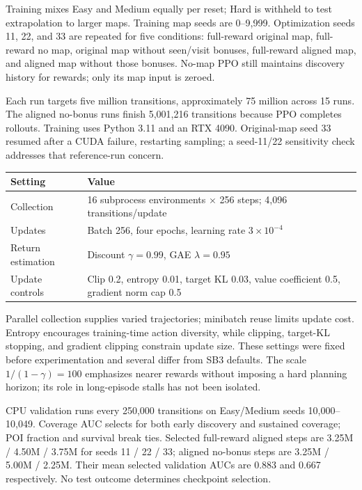 \documentclass[10pt,a4paper]{article}
\newcommand{\heading}[1]{\vspace{5pt}{\large\bfseries\color{ink}#1}\par\vspace{1pt}}
\begin{document}
\newpage
\heading{5\quad Training setup and baselines}
Training mixes Easy and Medium equally per reset; Hard is withheld to test extrapolation to larger maps. Training map seeds are 0--9,999. Optimization seeds 11, 22, and 33 are repeated for five conditions: full-reward original map, full-reward no map, original map without seen/visit bonuses, full-reward aligned map, and aligned map without those bonuses. No-map PPO still maintains discovery history for rewards; only its map input is zeroed.

Each run targets five million transitions, approximately 75 million across 15 runs. The aligned no-bonus runs finish 5,001,216 transitions because PPO completes rollouts. Training uses Python 3.11 and an RTX 4090. Original-map seed 33 resumed after a CUDA failure, restarting sampling; a seed-11/22 sensitivity check addresses that reference-run concern.
\begin{center}\small
\begin{tabularx}{\linewidth}{@{}lX@{}}\toprule
Setting & Value\\\midrule
Collection & 16 subprocess environments $\times$ 256 steps; 4,096 transitions/update\\
Updates & Batch 256, four epochs, learning rate $3\times10^{-4}$\\
Return estimation & Discount $\gamma=0.99$, GAE $\lambda=0.95$\\
Update controls & Clip 0.2, entropy 0.01, target KL 0.03, value coefficient 0.5, gradient norm cap 0.5\\\bottomrule
\end{tabularx}
\end{center}
Parallel collection supplies varied trajectories; minibatch reuse limits update cost. Entropy encourages training-time action diversity, while clipping, target-KL stopping, and gradient clipping constrain update size. These settings were fixed before experimentation and several differ from SB3 defaults. The scale $1/(1-\gamma)=100$ emphasizes nearer rewards without imposing a hard planning horizon; its role in long-episode stalls has not been isolated.

CPU validation runs every 250,000 transitions on Easy/Medium seeds 10,000--10,049. Coverage AUC selects for both early discovery and sustained coverage; POI fraction and survival break ties. Selected full-reward aligned steps are 3.25M / 4.50M / 3.75M for seeds 11 / 22 / 33; aligned no-bonus steps are 3.25M / 5.00M / 2.25M. Their mean selected validation AUCs are 0.883 and 0.667 respectively. No test outcome determines checkpoint selection.
\end{document}
